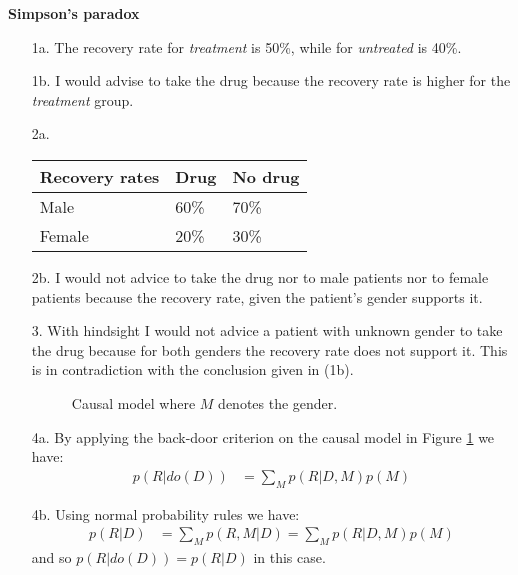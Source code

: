 \documentclass{amsmlaj}
\begin{document}
\begin{problem}{\textbf{Simpson's paradox}}
\begin{sol}
	\begin{itemize}
		\item[1a.] The recovery rate for \textit{treatment} is 50\%, while for
			\textit{untreated} is 40\%.
		\item[1b.] I would advise to take the drug because the recovery rate is
			higher for the \textit{treatment} group.
		\item[2a.]
			\begin{tabular}[H]{ l | l | l }
				\textbf{Recovery rates} & Drug & No drug \\
				\hline
				Male & 60\% & 70\% \\
				Female & 20\% & 30\%
			\end{tabular}
		\item[2b.] I would not advice to take the drug nor to male patients nor to
			female patients because the recovery rate, given the patient's gender supports it.
		\item[3.] With hindsight I would not advice a patient with unknown gender to
			take the drug because for both genders the recovery rate does not support
			it. This is in contradiction with the conclusion given in (1b).
		\begin{figure}[H]
			\centering
			\caption{Causal model where $M$ denotes the gender.}
			\label{fig:p3i}
		\end{figure}
		\item[4a.] By applying the back-door criterion on the causal model in Figure
			\ref{fig:p3i} we have:
			\begin{align}
				p(R|do(D)) &= \sum_M p(R|D,M)p(M)
			\end{align}
		\item[4b.] Using normal probability rules we have:
			\begin{align}
				p(R|D) &= \sum_M p(R,M|D) = \sum_M p(R|D,M)p(M)
			\end{align}
			and so $p(R|do(D)) = p(R|D)$ in this case.
	\end{itemize}
\end{sol}
\end{problem}
\end{document}

